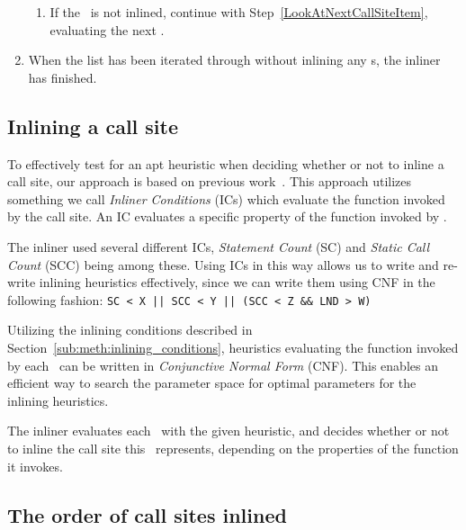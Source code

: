 \begin{enumerate}
\begin{enumerate}
		\item If the \applyNode~is not inlined, continue with
Step~\ref{LookAtNextCallSiteItem}, evaluating the next \applyNode .
		\label{InlineCallSiteItem}
	\end{enumerate}

	\item When the list has been iterated through without inlining any
\applyNode s, the inliner has finished.
\end{enumerate}

\subsection{Inlining a call site}
\label{sub:scheme:inlining_apply_nodes}

To effectively test for an apt heuristic when deciding whether or not to inline
a call site, our approach is based on previous
work~\cite{deshpande2012statically}\cite{AdaptvCompilAndInlingWaterman}. This
approach utilizes something we call \textit{Inliner Conditions} (ICs) which
evaluate the function invoked by the call site. An IC evaluates a specific
property of the function invoked by \applyNode .

The inliner used several different ICs, \textit{Statement Count} (SC) and
\textit{Static Call Count} (SCC) being among these. Using ICs in this way allows
us to write and re-write inlining heuristics effectively, since we can write
them using CNF in the following fashion:
\lstinline"SC < X || SCC < Y || (SCC < Z && LND > W)"

Utilizing the inlining conditions described in
Section~\ref{sub:meth:inlining_conditions}, heuristics evaluating the function
invoked by each \applyNode~can be written in \textit{Conjunctive Normal Form}
(CNF). This enables an efficient way to search the parameter space for optimal
parameters for the inlining heuristics.

The inliner evaluates each \applyNode~with the given heuristic, and decides
whether or not to inline the call site this \applyNode~represents, depending on
the properties of the function it invokes.


\subsection{The order of call sites inlined}
\label{sub:scheme:ordering_apply_nodes}

